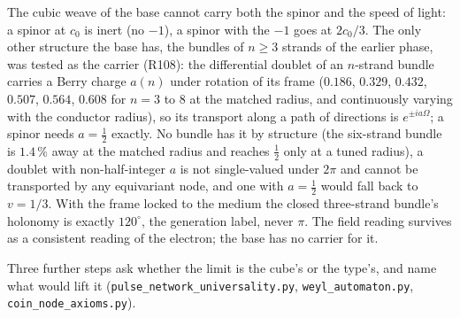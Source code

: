 \documentclass[11pt,a4paper]{article}
\theoremstyle{plain}
\theoremstyle{remark}
\begin{document}
The cubic weave of the base cannot carry both the spinor and the speed of light: a spinor at $c_0$
is inert (no $-1$), a spinor with the $-1$ goes at $2c_0/3$. The only other structure the base has,
the bundles of $n \ge 3$ strands of the earlier phase, was tested as the carrier (R108): the
differential doublet of an $n$-strand bundle carries a Berry charge $a(n)$ under rotation of its
frame ($0.186$, $0.329$, $0.432$, $0.507$, $0.564$, $0.608$ for $n = 3$ to $8$ at the matched
radius, and continuously varying with the conductor radius), so its transport along a path of
directions is $e^{\pm ia\Omega}$; a spinor needs $a = \tfrac12$ exactly. No bundle has it by
structure (the six-strand bundle is $1.4\,\%$ away at the matched radius and reaches $\tfrac12$
only at a tuned radius), a doublet with non-half-integer $a$ is not single-valued under $2\pi$
and cannot be transported by any equivariant node, and one with $a = \tfrac12$ would fall back to
$v = 1/3$. With the frame locked to the medium the closed three-strand bundle's holonomy is
exactly $120^\circ$, the generation label, never $\pi$. The field reading survives as a
consistent reading of the electron; the base has no carrier for it.

Three further steps ask whether the limit is the cube's or the type's, and name what would lift it
(\texttt{pulse\_network\_universality.py}, \texttt{weyl\_automaton.py},
\texttt{coin\_node\_axioms.py}).
\end{document}
